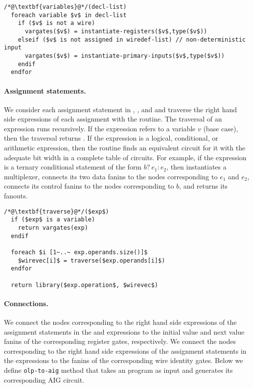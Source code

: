 \begin{lstlisting}
/*@\textbf{variables}@*/(decl-list)
  foreach variable $v$ in decl-list
    if ($v$ is not a wire) 
      vargates($v$) = instantiate-registers($v$,type($v$))
    elseif ($v$ is not assigned in wiredef-list) // non-deterministic input
      vargates($v$) = instantiate-primary-inputs($v$,type($v$))
    endif
  endfor
\end{lstlisting}


\paragraph{Assignment statements.}
We consider each assignment statement in , ,
and  and traverse the right hand side expressions of
each assignment with the  routine. 
The traversal of an expression runs recursively. 
%
If the expression refers to a variable $v$ (base case), 
then the traversal returns . 
%
If the expression is a logical, conditional, or arithmetic expression, then
the  routine finds an equivalent circuit for it with the adequate bit
width in a complete table of circuits.
For example, if the expression is a ternary conditional statement of the
form $b?~e_1:e_2$, then  instantiates a multiplexer, 
connects its two data fanins to the nodes corresponding to $e_1$ and $e_2$, 
connects its control fanins to the nodes corresponding to $b$,
and returns its fanouts. 

\begin{lstlisting}
/*@\textbf{traverse}@*/($exp$)
  if ($exp$ is a variable) 
    return vargates(exp)
  endif

  foreach $i [1~..~ exp.operands.size()]$ 
    $wirevec[i]$ = traverse($exp.operands[i]$) 
  endfor

  return library($exp.operation$, $wirevec$)
\end{lstlisting}

\paragraph{Connections.}
We connect the nodes corresponding to the right hand side expressions 
of the assignment statements in the  and 
expressions 
to the initial value and next value fanins of the corresponding register gates, 
respectively. 
%
We connect the nodes corresponding to the right hand side expressions
of the assignment statements in the  expressions to the 
fanins of the corresponding wire identity gates. Below we define \texttt{olp-to-aig} method that takes an \caig program as input and generates its corresponding AIG circuit. 


